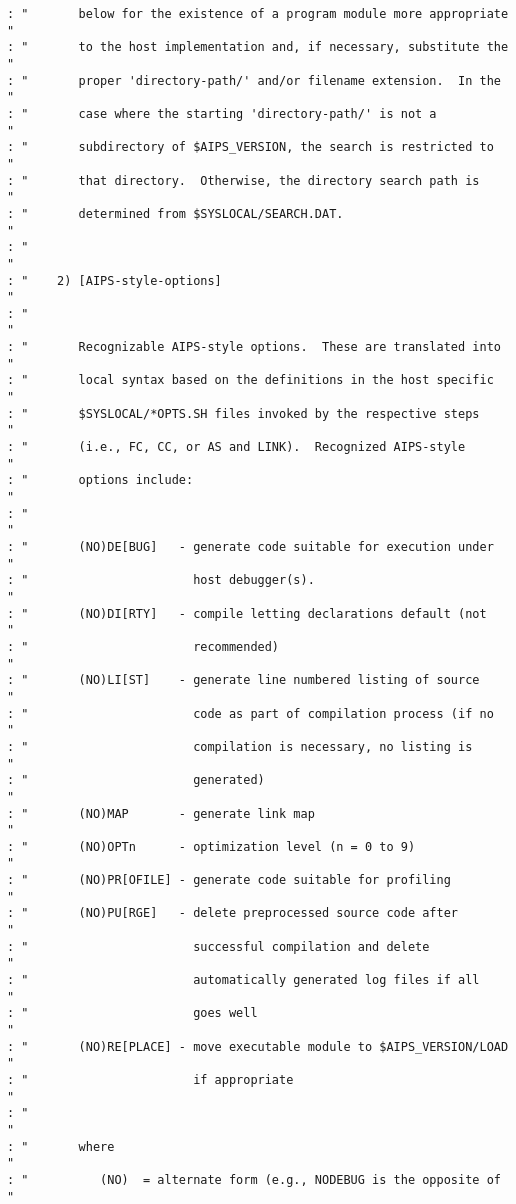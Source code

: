 \begin{verbatim}
: "       below for the existence of a program module more appropriate "
: "       to the host implementation and, if necessary, substitute the "
: "       proper 'directory-path/' and/or filename extension.  In the  "
: "       case where the starting 'directory-path/' is not a           "
: "       subdirectory of $AIPS_VERSION, the search is restricted to   "
: "       that directory.  Otherwise, the directory search path is     "
: "       determined from $SYSLOCAL/SEARCH.DAT.                        "
: "                                                                    "
: "    2) [AIPS-style-options]                                         "
: "                                                                    "
: "       Recognizable AIPS-style options.  These are translated into  "
: "       local syntax based on the definitions in the host specific   "
: "       $SYSLOCAL/*OPTS.SH files invoked by the respective steps     "
: "       (i.e., FC, CC, or AS and LINK).  Recognized AIPS-style       "
: "       options include:                                             "
: "                                                                    "
: "       (NO)DE[BUG]   - generate code suitable for execution under   "
: "                       host debugger(s).                            "
: "       (NO)DI[RTY]   - compile letting declarations default (not    "
: "                       recommended)                                 "
: "       (NO)LI[ST]    - generate line numbered listing of source     "
: "                       code as part of compilation process (if no   "
: "                       compilation is necessary, no listing is      "
: "                       generated)                                   "
: "       (NO)MAP       - generate link map                            "
: "       (NO)OPTn      - optimization level (n = 0 to 9)              "
: "       (NO)PR[OFILE] - generate code suitable for profiling         "
: "       (NO)PU[RGE]   - delete preprocessed source code after        "
: "                       successful compilation and delete            "
: "                       automatically generated log files if all     "
: "                       goes well                                    "
: "       (NO)RE[PLACE] - move executable module to $AIPS_VERSION/LOAD "
: "                       if appropriate                               "
: "                                                                    "
: "       where                                                        "
: "          (NO)  = alternate form (e.g., NODEBUG is the opposite of  "

\end{verbatim}
